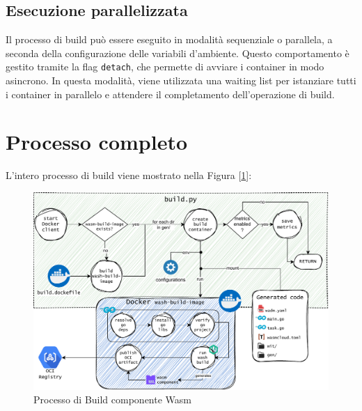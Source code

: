 \subsection{Esecuzione parallelizzata}

Il processo di build può essere eseguito in modalità sequenziale o parallela, a seconda della configurazione delle variabili d'ambiente. Questo comportamento è gestito tramite la flag \texttt{detach}, che permette di avviare i container in modo asincrono. In questa modalità, viene utilizzata una waiting list per istanziare tutti i container in parallelo e attendere il completamento dell'operazione di build.\\

\section{Processo completo}

L'intero processo di build viene mostrato nella Figura [\ref{fig:impl_build}]:

\FloatBarrier
\begin{figure}[h]
    \centering
    \includegraphics[width=\textwidth]{img/schemi/schemi-implementazione-build.drawio.pdf}
    \caption{Processo di Build componente Wasm}
    \label{fig:impl_build}
\end{figure}
\FloatBarrier